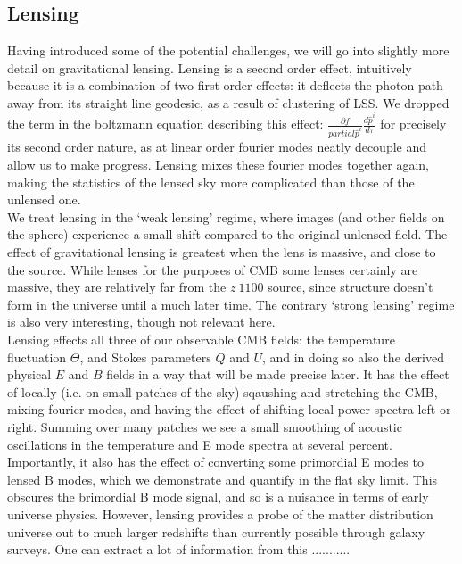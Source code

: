 \documentclass[a4paper,11pt]{article}
\begin{document}
\subsection{Lensing}

Having introduced some of the potential challenges, we will go into slightly more detail on gravitational lensing. Lensing is a second order effect, intuitively because it is a combination of two first order effects: it deflects the photon path away from its straight line geodesic, as a result of clustering of LSS. We dropped the term in the boltzmann equation describing this effect:  $\frac{\partial f}{partial\hat{p}^i}\frac{d\hat{p}^i}{d\tau}$ for precisely its second order nature, as at linear order fourier modes neatly decouple and allow us to make progress. Lensing mixes these fourier modes together again, making the statistics of the lensed sky more complicated than those of the unlensed one. \\
We treat lensing in the `weak lensing' regime, where images (and other fields on the sphere) experience a small shift compared to the original unlensed field. The effect of gravitational lensing is greatest when the lens is massive, and close to the source. While lenses for the purposes of CMB some lenses certainly are massive, they are relatively far from the $z~1100$ source, since structure doesn't form in the universe until a much later time. The contrary `strong lensing' regime is also very interesting, though not relevant here.\\

Lensing effects all three of our observable CMB fields: the temperature fluctuation $\Theta$, and Stokes parameters $Q$ and $U$, and in doing so also the derived physical $E$ and $B$ fields in a way that will be made precise later. It has the effect of locally (i.e. on small patches of the sky) sqaushing and stretching the CMB, mixing fourier modes, and having the effect of shifting local power spectra left or right. Summing over many patches we see a small smoothing of acoustic oscillations in the temperature and E mode spectra at several percent. \\

Importantly, it also has the effect of converting some primordial E modes to lensed B modes, which we demonstrate and quantify in the flat sky limit. This obscures the brimordial B mode signal, and so is a nuisance in terms of early universe physics. However, lensing provides a probe of the matter distribution universe out to much larger redshifts than currently possible through galaxy surveys. One can extract a lot of information from this ...........
\end{document}
